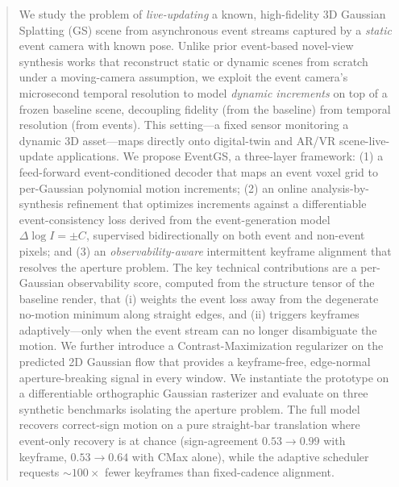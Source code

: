 \begin{abstract}
We study the problem of \emph{live-updating} a known, high-fidelity 3D Gaussian Splatting (GS) scene from asynchronous event streams captured by a \emph{static} event camera with known pose. Unlike prior event-based novel-view synthesis works that reconstruct static or dynamic scenes from scratch under a moving-camera assumption, we exploit the event camera's microsecond temporal resolution to model \emph{dynamic increments} on top of a frozen baseline scene, decoupling fidelity (from the baseline) from temporal resolution (from events). This setting---a fixed sensor monitoring a dynamic 3D asset---maps directly onto digital-twin and AR/VR scene-live-update applications. We propose EventGS, a three-layer framework: (1) a feed-forward event-conditioned decoder that maps an event voxel grid to per-Gaussian polynomial motion increments; (2) an online analysis-by-synthesis refinement that optimizes increments against a differentiable event-consistency loss derived from the event-generation model $\Delta\log I = \pm C$, supervised bidirectionally on both event and non-event pixels; and (3) an \emph{observability-aware} intermittent keyframe alignment that resolves the aperture problem. The key technical contributions are a per-Gaussian observability score, computed from the structure tensor of the baseline render, that (i) weights the event loss away from the degenerate no-motion minimum along straight edges, and (ii) triggers keyframes adaptively---only when the event stream can no longer disambiguate the motion. We further introduce a Contrast-Maximization regularizer on the predicted 2D Gaussian flow that provides a keyframe-free, edge-normal aperture-breaking signal in every window. We instantiate the prototype on a differentiable orthographic Gaussian rasterizer and evaluate on three synthetic benchmarks isolating the aperture problem. The full model recovers correct-sign motion on a pure straight-bar translation where event-only recovery is at chance (sign-agreement $0.53 \to 0.99$ with keyframe, $0.53 \to 0.64$ with CMax alone), while the adaptive scheduler requests $\sim$$100\times$ fewer keyframes than fixed-cadence alignment.
\end{abstract}
